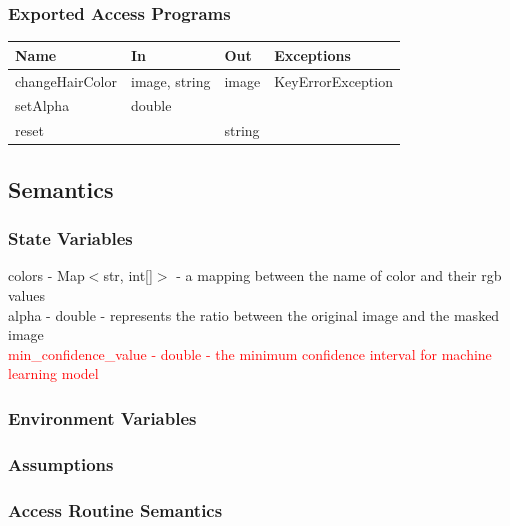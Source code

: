 \documentclass[12pt, titlepage]{article}
\begin{document}
\subsubsection{Exported Access Programs}

\begin{center}
\begin{tabular}{p{4cm} p{3cm} p{4cm} p{4cm}}
\hline
\textbf{Name} & \textbf{In} & \textbf{Out} & \textbf{Exceptions} \\
\hline
changeHairColor & image, string & image & KeyErrorException \\
setAlpha & double & & \\
reset & & string & \\
\hline
\end{tabular}
\end{center}

\subsection{Semantics}

\subsubsection{State Variables}
colors - Map$<$str, int[]$>$ - a mapping between the name of color and their rgb values \\
alpha - double - represents the ratio between the original image and the masked image \\ 
\textcolor{red}{min\_confidence\_value - double - the minimum confidence interval for machine learning model}

\subsubsection{Environment Variables}

\subsubsection{Assumptions}

\subsubsection{Access Routine Semantics}
\end{document}
